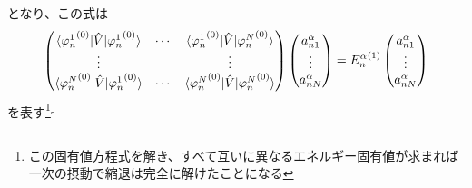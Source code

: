 \documentclass{jsarticle}  %
\numberwithin{equation}{section} %
\numberwithin{figure}{section}
\begin{document}
    となり、この式は
    \begin{align}
            \left(
            \begin{matrix}
                \braket{{\varphi_n^1}^{(0)}|\hat{V}|{\varphi_n^1}^{(0)}}&\cdots&\braket{{\varphi_n^1}^{(0)}|\hat{V}|{\varphi_n^N}^{(0)}}\\
                \vdots&&\vdots\\
                \braket{{\varphi_n^N}^{(0)}|\hat{V}|{\varphi_n^1}^{(0)}}&\cdots&\braket{{\varphi_n^N}^{(0)}|\hat{V}|{\varphi_n^N}^{(0)}}
            \end{matrix}
            \right)
            \left(
            \begin{matrix}
                a_{n1}^\alpha\\
                \vdots\\
                a_{nN}^\alpha
            \end{matrix}
            \right) = {E_n^\alpha}^{(1)}
            \left(
            \begin{matrix}
                a_{n1}^\alpha\\
                \vdots\\
                a_{nN}^\alpha
            \end{matrix}
            \right)
        \end{align}
        を表す\footnote{この固有値方程式を解き、すべて互いに異なるエネルギー固有値が求まれば一次の摂動で縮退は完全に解けたことになる}$\square$
\end{document}
